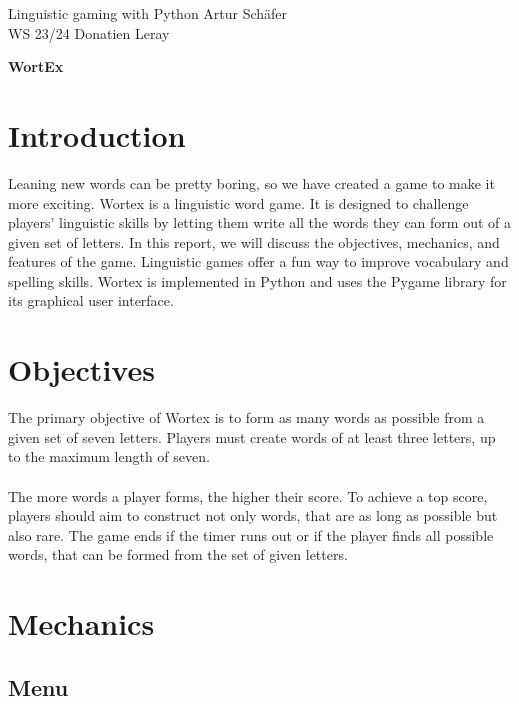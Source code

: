 \documentclass{article}[12pt]
\newcommand{\aetitle}{WortEx} %
\newcommand{\studentOne}{Artur Schäfer} %
\newcommand{\studentTwo}{Donatien Leray} %
\begin{document}
\noindent
Linguistic gaming with Python \hfill \studentOne\\
WS 23/24 \hfill \studentTwo

{\begin{center}
\begin{sffamily}\Huge\bfseries \aetitle \end{sffamily}
\end{center}}


    \section*{Introduction}

    Leaning new words can be pretty boring, so we have created a game to make
    it more exciting. Wortex is a linguistic word game. It is designed to
    challenge players' linguistic skills by letting them write all the words
    they can form out of a given set of letters. In this report, we will
    discuss the objectives, mechanics, and features of the game. Linguistic
    games offer a fun way to improve vocabulary and spelling skills. Wortex is
    implemented in Python and uses the Pygame library for its graphical user
    interface.

    \section*{Objectives}

    The primary objective of Wortex is to form as many words as possible from a
    given set of seven letters. Players must create words of at least three
    letters, up  to the maximum length of seven. \\\\ The more words a player
    forms, the higher their score. To achieve a top score, players should aim
    to construct not only words, that are as long as possible but also rare.
    The game ends if the timer runs out or if the player finds all possible
    words, that can be formed from the set of given letters.

    \section*{Mechanics}

    \subsection*{Menu}
\end{document}
